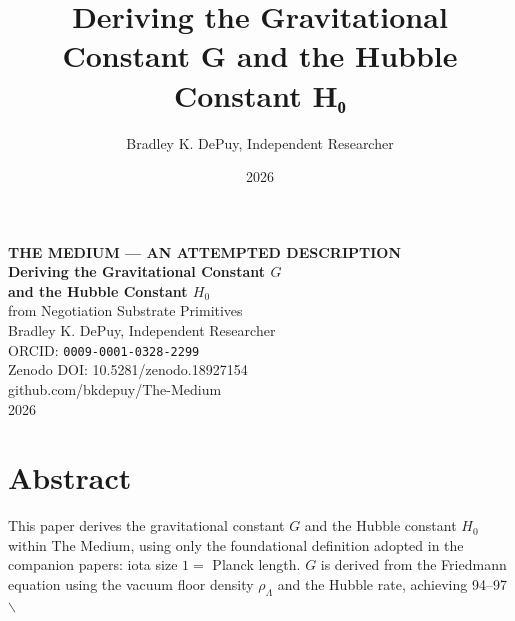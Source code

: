 \documentclass[11pt,letterpaper]{article}
\author{Bradley K. DePuy, Independent Researcher}
\date{2026}
\title{Deriving the Gravitational Constant G and the Hubble Constant H₀}
\begin{document}
\pagestyle{plain}
\begin{titlepage}
\vspace*{3cm}
\begin{center}
  {\large\bfseries THE MEDIUM --- AN ATTEMPTED DESCRIPTION}\\[1em]
  {\LARGE\bfseries Deriving the Gravitational Constant $G$}\\[0.4em]
  {\LARGE\bfseries and the Hubble Constant $H_0$}\\[0.4em]
  {\large from Negotiation Substrate Primitives}\\[2em]
  {\normalsize Bradley K. DePuy, Independent Researcher}\\[0.4em]
  {\normalsize ORCID: \texttt{0009-0001-0328-2299}}\\[0.4em]
  {\normalsize Zenodo DOI: 10.5281/zenodo.18927154}\\[0.4em]
  {\normalsize github.com/bkdepuy/The-Medium}\\[0.4em]
  {\normalsize 2026}
\end{center}
\end{titlepage}
\pagestyle{body}

\section{Abstract}
\label{sec:orgb7ca734}

This paper derives the gravitational constant \(G\) and the Hubble constant \(H_0\) within The Medium, using only the foundational definition adopted in the companion papers: iota size \(1 =\) Planck length. \(G\) is derived from the Friedmann equation using the vacuum floor density \(\rho_\Lambda\) and the Hubble rate, achieving 94--97$\backslash$%
\end{document}
